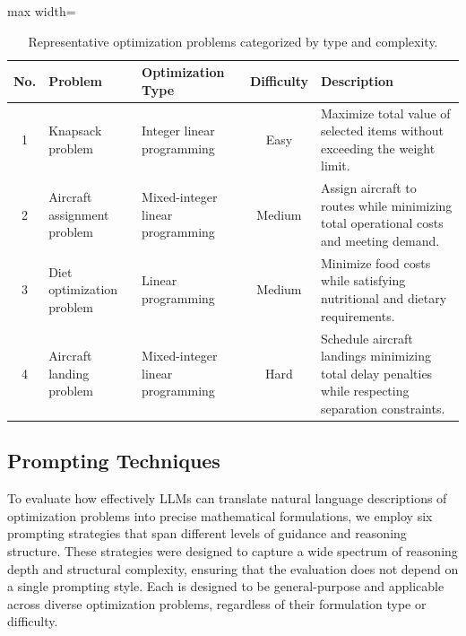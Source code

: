\documentclass[review,12pt]{elsarticle}
\begin{document}
\begin{table}[H]
\centering
\caption{Representative optimization problems categorized by type and complexity.}
\label{tab:OptimizationProblems}
\renewcommand{\arraystretch}{0.9} %
\setlength{\tabcolsep}{4pt}      %
\scriptsize                      %

\begin{adjustbox}{max width=\linewidth}
\begin{tabular}{|c|l|l|c|p{5.8cm}|}
\hline
\textbf{No.} & \textbf{Problem} & \textbf{Optimization Type} & \textbf{Difficulty} & \textbf{Description} \\ \hline
1 & Knapsack problem~\cite{COMPLEXOR} & Integer linear programming & Easy & Maximize total value of selected items without exceeding the weight limit. \\ \hline
2 & Aircraft assignment problem~\cite{COMPLEXOR} & Mixed-integer linear programming & Medium & Assign aircraft to routes while minimizing total operational costs and meeting demand. \\ \hline
3 & Diet optimization problem~\cite{COMPLEXOR} & Linear programming & Medium & Minimize food costs while satisfying nutritional and dietary requirements. \\ \hline
4 & Aircraft landing problem~\cite{COMPLEXOR} & Mixed-integer linear programming & Hard & Schedule aircraft landings minimizing total delay penalties while respecting separation constraints. \\ \hline
\end{tabular}
\end{adjustbox}
\end{table}





\subsection{Prompting Techniques}\label{PromptingTechniques}

To evaluate how effectively LLMs can translate natural language descriptions of optimization problems into precise mathematical formulations, we employ six prompting strategies that span different levels of guidance and reasoning structure. These strategies were designed to capture a wide spectrum of reasoning depth and structural complexity, ensuring that the evaluation does not depend on a single prompting style. Each is designed to be general-purpose and applicable across diverse optimization problems, regardless of their formulation type or difficulty.
\end{document}
